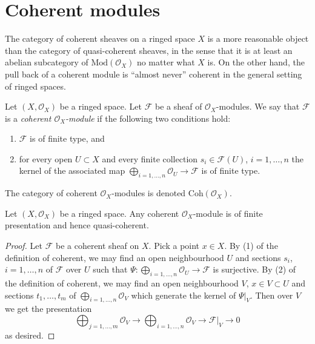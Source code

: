 \section{Coherent modules}
\label{section-coherent}

\noindent
The category of coherent sheaves on a ringed space $X$
is a more reasonable object
than the category of quasi-coherent sheaves, in the sense
that it is at least an abelian subcategory of $\text{Mod}(\mathcal{O}_X)$
no matter what $X$ is. On the other hand, the pull back of a
coherent module is ``almost never'' coherent in the general setting
of ringed spaces.

\begin{definition}
\label{definition-coherent}
Let $(X, \mathcal{O}_X)$ be a ringed space.
Let $\mathcal{F}$ be a sheaf of $\mathcal{O}_X$-modules.
We say that $\mathcal{F}$ is a {\it coherent $\mathcal{O}_X$-module}
if the following two conditions hold:
\begin{enumerate}
\item $\mathcal{F}$ is of finite type, and
\item for every open $U \subset X$ and every finite
collection $s_i \in \mathcal{F}(U)$, $i = 1, \ldots, n$
the kernel of the associated map
$\bigoplus_{i = 1, \ldots, n} \mathcal{O}_U \to \mathcal{F}$
is of finite type.
\end{enumerate}
The category of coherent $\mathcal{O}_X$-modules is denoted
$\text{Coh}(\mathcal{O}_X)$.
\end{definition}

\begin{lemma}
\label{lemma-coherent-finite-presentation}
Let $(X, \mathcal{O}_X)$ be a ringed space.
Any coherent $\mathcal{O}_X$-module is of finite presentation
and hence quasi-coherent.
\end{lemma}

\begin{proof}
Let $\mathcal{F}$ be a coherent sheaf on $X$.
Pick a point $x \in X$.
By (1) of the definition of coherent, we may find an open neighbourhood $U$
and sections $s_i$, $i = 1, \ldots, n$ of $\mathcal{F}$ over $U$
such that $\Psi : \bigoplus_{i = 1, \ldots, n} \mathcal{O}_U \to \mathcal{F}$
is surjective. By (2) of the definition of coherent, we may find
an open neighbourhood $V$, $x \in V \subset U$ and sections
$t_1, \ldots, t_m$ of $\bigoplus_{i = 1, \ldots, n} \mathcal{O}_V$
which generate the kernel of $\Psi|_V$. Then over $V$ we get the
presentation
$$
\bigoplus\nolimits_{j = 1, \ldots, m}
\mathcal{O}_V
\longrightarrow
\bigoplus\nolimits_{i = 1, \ldots, n}
\mathcal{O}_V
\to
\mathcal{F}|_V
\to
0
$$
as desired.
\end{proof}

